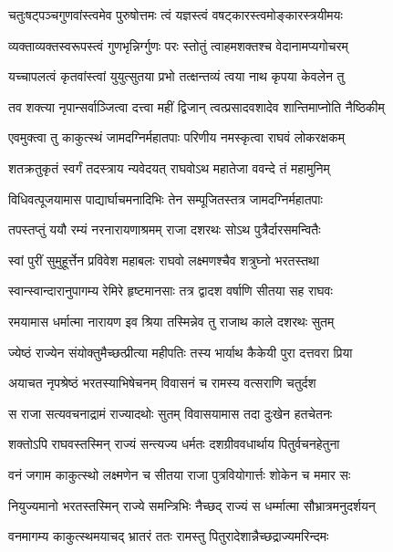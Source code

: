 \twolineshloka
{चतुःषट्पञ्चगुणवांस्त्वमेव पुरुषोत्तमः}
{त्वं यज्ञस्त्वं वषट्कारस्त्वमोङ्कारस्त्रयीमयः}%

\twolineshloka
{व्यक्ताव्यक्तस्वरूपस्त्वं गुणभृन्निर्ग्गुणः परः}
{स्तोतुं त्वाहमशक्तश्च वेदानामप्यगोचरम्}%

\twolineshloka
{यच्चापलत्वं कृतवांस्त्वां युयुत्सुतया प्रभो}
{तत्क्षन्तव्यं त्वया नाथ कृपया केवलेन तु}%

\twolineshloka
{तव शक्त्या नृपान्सर्वाञ्जित्वा दत्त्वा महीं द्विजान्}
{त्वत्प्रसादवशादेव शान्तिमाप्नोति नैष्ठिकीम्}%


\twolineshloka
{एवमुक्त्वा तु काकुत्स्थं जामदग्निर्महातपाः}
{परिणीय नमस्कृत्वा राघवं लोकरक्षकम्}%

\twolineshloka
{शतक्रतुकृतं स्वर्गं तदस्त्राय न्यवेदयत्}
{राघवोऽथ महातेजा ववन्दे तं महामुनिम्}%

\twolineshloka
{विधिवत्पूजयामास पाद्यार्घाचमनादिभिः}
{तेन सम्पूजितस्तत्र जामदग्निर्महातपाः}%

\twolineshloka
{तपस्तप्तुं ययौ रम्यं नरनारायणाश्रमम्}
{राजा दशरथः सोऽथ पुत्रैर्दारसमन्वितैः}%

\twolineshloka
{स्वां पुरीं सुमुहूर्त्तेन प्रविवेश महाबलः}
{राघवो लक्ष्मणश्चैव शत्रुघ्नो भरतस्तथा}%

\twolineshloka
{स्वान्स्वान्दारानुपागम्य रेमिरे हृष्टमानसाः}
{तत्र द्वादश वर्षाणि सीतया सह राघवः}%

\twolineshloka
{रमयामास धर्मात्मा नारायण इव श्रिया}
{तस्मिन्नेव तु राजाथ काले दशरथः सुतम्}%

\twolineshloka
{ज्येष्ठं राज्येन संयोक्तुमैच्छत्प्रीत्या महीपतिः}
{तस्य भार्याथ कैकेयी पुरा दत्तवरा प्रिया}%

\twolineshloka
{अयाचत नृपश्रेष्ठं भरतस्याभिषेचनम्}
{विवासनं च रामस्य वत्सराणि चतुर्दश}%

\twolineshloka
{स राजा सत्यवचनाद्रामं राज्यादथोः सुतम्}
{विवासयामास तदा दुःखेन हतचेतनः}%

\twolineshloka
{शक्तोऽपि राघवस्तस्मिन् राज्यं सन्त्यज्य धर्मतः}
{दशग्रीववधार्थाय पितुर्वचनहेतुना}%

\twolineshloka
{वनं जगाम काकुत्स्थो लक्ष्मणेन च सीतया}
{राजा पुत्रवियोगार्त्तः शोकेन च ममार सः}%

\twolineshloka
{नियुज्यमानो भरतस्तस्मिन् राज्ये समन्त्रिभिः}
{नैच्छद् राज्यं स धर्म्मात्मा सौभ्रात्रमनुदर्शयन्}%

\twolineshloka
{वनमागम्य काकुत्स्थमयाचद् भ्रातरं ततः}
{रामस्तु पितुरादेशान्नैच्छद्राज्यमरिन्दमः}%


